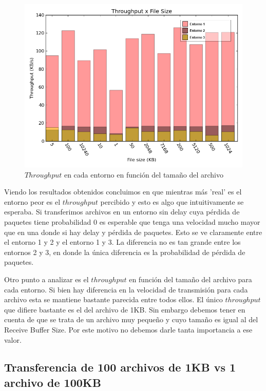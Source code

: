 \begin{figure}[H]
	\begin{center}
		  \includegraphics[scale=0.5]{../graficos/test1_1.png}
		  \caption{$Throughput$ en cada entorno en función del tamaño del archivo}
		  \label{fig:contra1}
	\end{center}
\end{figure}

Viendo los resultados obtenidos concluimos en que mientras más 'real' es el entorno peor es el $throughput$ percibido y esto es algo que intuitivamente se esperaba. Si transferimos archivos en un entorno sin delay cuya pérdida de paquetes tiene probabilidad 0 es esperable que tenga una velocidad mucho mayor que en una donde si hay delay y pérdida de paquetes. Esto se ve claramente entre el entorno 1 y 2 y el entorno 1 y 3. La diferencia no es tan grande entre los entornos 2 y 3, en donde la única diferencia es la probabilidad de pérdida de paquetes.

Otro punto a analizar es el $throughput$ en función del tamaño del archivo para cada entorno. Si bien hay diferencia en la velocidad de transmisión para cada archivo esta se mantiene bastante parecida entre todos ellos. El único $throughput$ que difiere bastante es el del archivo de 1KB. Sin embargo debemos tener en cuenta de que se trata de un archivo muy pequeño y cuyo tamaño es igual al del Receive Buffer Size. Por este motivo no debemos darle tanta importancia a ese valor.

\subsection{Transferencia de 100 archivos de 1KB vs 1 archivo de 100KB}

